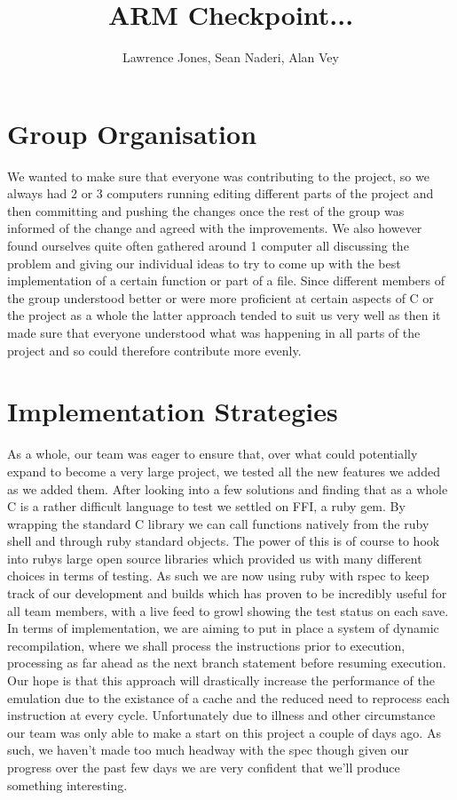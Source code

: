 \documentclass[11pt]{article}
\begin{document}
\title{ARM Checkpoint... }
\author{Lawrence Jones, Sean Naderi, Alan Vey}

\maketitle

\section{Group Organisation}

We wanted to make sure that everyone was contributing to the project, so we always had 2 or 3 computers running editing different parts of the project and then committing and pushing the changes once the rest of the group was informed of the change and agreed with the improvements. We also however found ourselves quite often gathered around 1 computer all discussing the problem and giving our individual ideas to try to come up with the best implementation of a certain function or part of a file. Since different members of the group understood better or were more proficient at certain aspects of C or the project as a whole the latter approach tended to suit us very well as then it made sure that everyone understood what was happening in all parts of the project and so could therefore contribute more evenly.  


\section{Implementation Strategies}

As a whole, our team was eager to ensure that, over what could potentially expand to become a very large project, we tested all the new features we added as we added them.
After looking into a few solutions and finding that as a whole C is a rather difficult language to test we settled on FFI, a ruby gem.
By wrapping the standard C library we can call functions natively from the ruby shell and through ruby standard objects. The power of this is of course to hook into rubys large
open source libraries which provided us with many different choices in terms of testing. As such we are now using ruby with rspec to keep track of our development and builds
which has proven to be incredibly useful for all team members, with a live feed to growl showing the test status on each save.
In terms of implementation, we are aiming to put in place a system of dynamic recompilation, where we shall process the instructions prior to execution, processing as far
ahead as the next branch statement before resuming execution. Our hope is that this approach will drastically increase the performance of the emulation due to the existance of
a cache and the reduced need to reprocess each instruction at every cycle.
Unfortunately due to illness and other circumstance our team was only able to make a start on this project a couple of days ago. As such, we haven't made too much headway
with the spec though given our progress over the past few days we are very confident that we'll produce something interesting.
\end{document}
